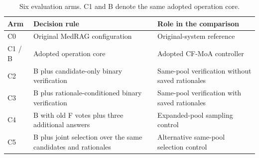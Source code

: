 \begin{table}[htbp]
\centering
\small
\caption{Six evaluation arms. C1 and B denote the same adopted operation core.}
\label{tab:arms}
\setlength{\tabcolsep}{5pt}
\begin{tabularx}{\linewidth}{@{}lXX@{}}
\toprule
Arm & Decision rule & Role in the comparison \\
\midrule
C0 & Original MedRAG configuration & Original-system reference \\
C1 / B & Adopted operation core & Adopted CF-MoA controller \\
C2 & B plus candidate-only binary verification & Same-pool verification without saved rationales \\
C3 & B plus rationale-conditioned binary verification & Same-pool verification with saved rationales \\
C4 & B with old F votes plus three additional answers & Expanded-pool sampling control \\
C5 & B plus joint selection over the same candidates and rationales & Alternative same-pool selection control \\
\bottomrule
\end{tabularx}
\end{table}
